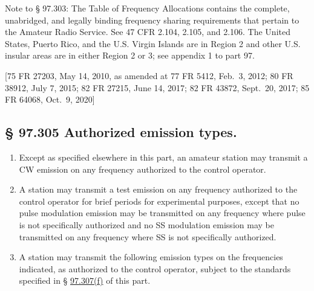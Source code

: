 \documentclass[
  letterpaper,
  DIV=11,
  numbers=noendperiod]{scrreport}
\begin{document}
Note to § 97.303: The Table of Frequency Allocations contains the
complete, unabridged, and legally binding frequency sharing requirements
that pertain to the Amateur Radio Service. See 47 CFR 2.104, 2.105, and
2.106. The United States, Puerto Rico, and the U.S. Virgin Islands are
in Region 2 and other U.S. insular areas are in either Region 2 or 3;
see appendix 1 to part 97.

{[}75 FR 27203, May 14, 2010, as amended at 77 FR 5412, Feb.~3, 2012; 80
FR 38912, July 7, 2015; 82 FR 27215, June 14, 2017; 82 FR 43872,
Sept.~20, 2017; 85 FR 64068, Oct.~9, 2020{]}

\hypertarget{97.305}{%
\subsection*{§ 97.305 Authorized emission types.}\label{97.305}}

\begin{enumerate}
\def\labelenumi{(\alph{enumi})}
\item
  Except as specified elsewhere in this part, an amateur station may
  transmit a CW emission on any frequency authorized to the control
  operator.
\item
  A station may transmit a test emission on any frequency authorized to
  the control operator for brief periods for experimental purposes,
  except that no pulse modulation emission may be transmitted on any
  frequency where pulse is not specifically authorized and no SS
  modulation emission may be transmitted on any frequency where SS is
  not specifically authorized.
\item
  A station may transmit the following emission types on the frequencies
  indicated, as authorized to the control operator, subject to the
  standards specified in § \protect\hyperlink{97.307}{97.307(f)} of this
  part.
\end{enumerate}
\end{document}
